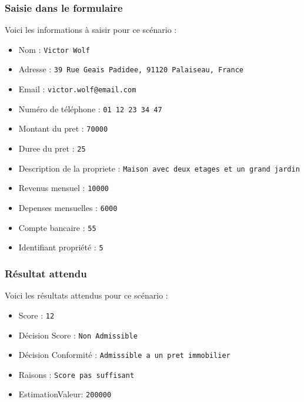 \documentclass{article}
\begin{document}
        \subsubsection{Saisie dans le formulaire}
        Voici les informations à saisir pour ce scénario :
        \begin{itemize}
            \item Nom : \texttt{Victor Wolf}
            \item Adresse : \texttt{39 Rue Geais Padidee, 91120 Palaiseau, France}  
            \item Email : \texttt{victor.wolf@email.com}  
            \item Numéro de téléphone : \texttt{01 12 23 34 47}  
            \item Montant du pret : \texttt{70000}  
            \item Duree du pret : \texttt{25}  
            \item Description de la propriete : \texttt{Maison avec deux etages et un grand jardin}  
            \item Revenus mensuel : \texttt{10000}
            \item Depenses mensuelles : \texttt{6000}
            \item Compte bancaire : \texttt{55}
            \item Identifiant propriété : \texttt{5}
        \end{itemize}
        
        \subsubsection{Résultat attendu}
                Voici les résultats attendus pour ce scénario :
        \begin{itemize}
            \item Score : \texttt{12}
            \item Décision Score : \texttt{Non Admissible}
            \item Décision Conformité : \texttt{Admissible a un pret immobilier}
            \item Raisons : \texttt{Score pas suffisant}
            \item EstimationValeur: \texttt{200000}
        \end{itemize}
        
\end{document}
